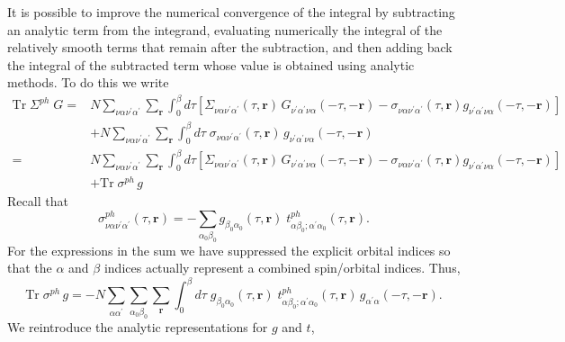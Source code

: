It is possible to improve the numerical convergence of the integral
by subtracting an analytic term from the integrand, evaluating
numerically the integral of the relatively smooth terms that
remain after the subtraction, and then adding back the
integral of the subtracted term whose value is obtained
using analytic methods.  To do this we write
\begin{equation}
\begin{split}
\mathrm{Tr}\;\Sigma^{ph} \; G = & 
N \sum_{\nu\alpha\nu^{\prime}\alpha^{\prime}} 
\sum_{\mathbf{r}} \int_0^{\beta} d\tau 
\left[ \Sigma_{\nu\alpha\nu^{\prime}\alpha^{\prime}}(\tau,\mathbf{r})
\, G_{\nu^{\prime}\alpha^{\prime}\nu\alpha}(-\tau,-\mathbf{r})
-  \sigma_{\nu\alpha\nu^{\prime}\alpha^{\prime}}(\tau,\mathbf{r})
g_{\nu^{\prime}\alpha^{\prime}\nu\alpha}(-\tau,-\mathbf{r}) \right]  \\
& + N \sum_{\nu\alpha\nu^{\prime}\alpha^{\prime}} 
\sum_{\mathbf{r}} \int_0^{\beta} d\tau\;
 \sigma_{\nu\alpha\nu^{\prime}\alpha^{\prime}}(\tau,\mathbf{r})
\, g_{\nu^{\prime}\alpha^{\prime}\nu\alpha}(-\tau,-\mathbf{r}) \\
= &  
N \sum_{\nu\alpha\nu^{\prime}\alpha^{\prime}} 
\sum_{\mathbf{r}} \int_0^{\beta} d\tau 
\left[ \Sigma_{\nu\alpha\nu^{\prime}\alpha^{\prime}}(\tau,\mathbf{r})
\, G_{\nu^{\prime}\alpha^{\prime}\nu\alpha}(-\tau,-\mathbf{r})
-  \sigma_{\nu\alpha\nu^{\prime}\alpha^{\prime}}(\tau,\mathbf{r})
g_{\nu^{\prime}\alpha^{\prime}\nu\alpha}(-\tau,-\mathbf{r}) \right]  \\
& + \mathrm{Tr}\;\sigma^{ph}\,g
\end{split}
\end{equation}
Recall that
\begin{equation}
\sigma^{ph}_{\nu\alpha\nu^{\prime}\alpha^{\prime}}(\tau,\mathbf{r}) =
-\sum_{\alpha_0 \beta_0}
g_{\beta_0 \alpha_0}(\tau,\mathbf{r})\; 
t^{ph}_{\alpha \beta_0; \alpha^{\prime}\alpha_0}(\tau,\mathbf{r}).
\end{equation}
For the expressions in the sum we have suppressed the explicit orbital
indices so that the $\alpha$ and $\beta$ indices actually represent a 
combined spin/orbital indices. Thus,
\begin{equation}
\mathrm{Tr}\;\sigma^{ph}\,g = -
N \sum_{\alpha\alpha^{\prime}} \sum_{\alpha_0\beta_0}
\sum_{\mathbf{r}} \int_0^{\beta} d\tau\;
g_{\beta_0 \alpha_0}(\tau,\mathbf{r})\; 
t^{ph}_{\alpha \beta_0; \alpha^{\prime}\alpha_0}(\tau,\mathbf{r})
\, g_{\alpha^{\prime}\alpha}(-\tau,-\mathbf{r}).
\end{equation}
We reintroduce the analytic representations for $g$ and $t$,
